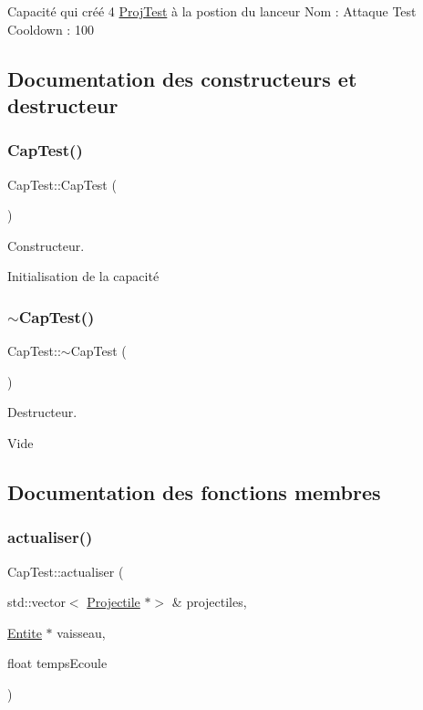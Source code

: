 Capacité qui créé 4 \hyperlink{class_proj_test}{Proj\+Test} à la postion du lanceur Nom \+: Attaque Test Cooldown \+: 100 

\subsection{Documentation des constructeurs et destructeur}
\mbox{\label{class_cap_test_a5f6d4b172a6a40f974b3f7414e3f06e5}} 
\subsubsection{\texorpdfstring{Cap\+Test()}{CapTest()}}
{\footnotesize\ttfamily Cap\+Test\+::\+Cap\+Test (\begin{DoxyParamCaption}{ }\end{DoxyParamCaption})}



Constructeur. 

Initialisation de la capacité \mbox{\label{class_cap_test_a92687aa212347d1738e7736cb107d03b}} 
\subsubsection{\texorpdfstring{$\sim$\+Cap\+Test()}{~CapTest()}}
{\footnotesize\ttfamily Cap\+Test\+::$\sim$\+Cap\+Test (\begin{DoxyParamCaption}{ }\end{DoxyParamCaption})}



Destructeur. 

Vide 

\subsection{Documentation des fonctions membres}
\mbox{\label{class_cap_test_af8e8fad88e1e4f0037eee576331d3238}} 
\subsubsection{\texorpdfstring{actualiser()}{actualiser()}}
{\footnotesize\ttfamily Cap\+Test\+::actualiser (\begin{DoxyParamCaption}\item[{std\+::vector$<$ \hyperlink{class_projectile}{Projectile} $\ast$$>$ \&}]{projectiles,  }\item[{\hyperlink{class_entite}{Entite} $\ast$}]{vaisseau,  }\item[{float}]{temps\+Ecoule }\end{DoxyParamCaption})\hspace{0.3cm}{\ttfamily [virtual]}}



